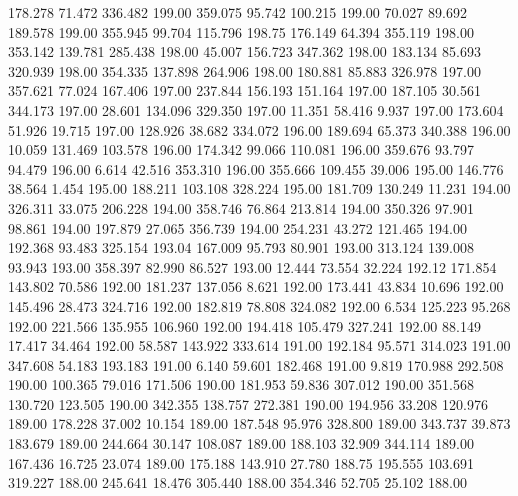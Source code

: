  178.278   71.472  336.482       199.00
 359.075   95.742  100.215       199.00
  70.027   89.692  189.578       199.00
 355.945   99.704  115.796       198.75
 176.149   64.394  355.119       198.00
 353.142  139.781  285.438       198.00
  45.007  156.723  347.362       198.00
 183.134   85.693  320.939       198.00
 354.335  137.898  264.906       198.00
 180.881   85.883  326.978       197.00
 357.621   77.024  167.406       197.00
 237.844  156.193  151.164       197.00
 187.105   30.561  344.173       197.00
  28.601  134.096  329.350       197.00
  11.351   58.416    9.937       197.00
 173.604   51.926   19.715       197.00
 128.926   38.682  334.072       196.00
 189.694   65.373  340.388       196.00
  10.059  131.469  103.578       196.00
 174.342   99.066  110.081       196.00
 359.676   93.797   94.479       196.00
   6.614   42.516  353.310       196.00
 355.666  109.455   39.006       195.00
 146.776   38.564    1.454       195.00
 188.211  103.108  328.224       195.00
 181.709  130.249   11.231       194.00
 326.311   33.075  206.228       194.00
 358.746   76.864  213.814       194.00
 350.326   97.901   98.861       194.00
 197.879   27.065  356.739       194.00
 254.231   43.272  121.465       194.00
 192.368   93.483  325.154       193.04
 167.009   95.793   80.901       193.00
 313.124  139.008   93.943       193.00
 358.397   82.990   86.527       193.00
  12.444   73.554   32.224       192.12
 171.854  143.802   70.586       192.00
 181.237  137.056    8.621       192.00
 173.441   43.834   10.696       192.00
 145.496   28.473  324.716       192.00
 182.819   78.808  324.082       192.00
   6.534  125.223   95.268       192.00
 221.566  135.955  106.960       192.00
 194.418  105.479  327.241       192.00
  88.149   17.417   34.464       192.00
  58.587  143.922  333.614       191.00
 192.184   95.571  314.023       191.00
 347.608   54.183  193.183       191.00
   6.140   59.601  182.468       191.00
   9.819  170.988  292.508       190.00
 100.365   79.016  171.506       190.00
 181.953   59.836  307.012       190.00
 351.568  130.720  123.505       190.00
 342.355  138.757  272.381       190.00
 194.956   33.208  120.976       189.00
 178.228   37.002   10.154       189.00
 187.548   95.976  328.800       189.00
 343.737   39.873  183.679       189.00
 244.664   30.147  108.087       189.00
 188.103   32.909  344.114       189.00
 167.436   16.725   23.074       189.00
 175.188  143.910   27.780       188.75
 195.555  103.691  319.227       188.00
 245.641   18.476  305.440       188.00
 354.346   52.705   25.102       188.00
